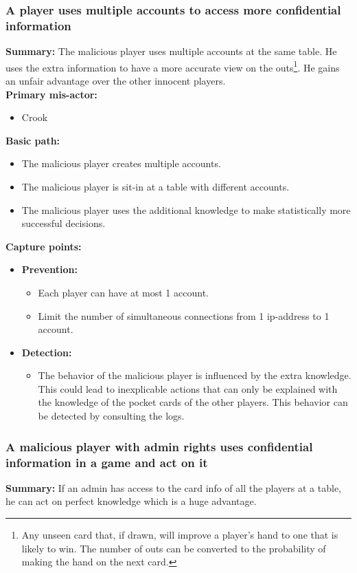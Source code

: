 \documentclass[a4paper,11pt]{report}
\begin{document}
\subsubsection{A player uses multiple accounts to access more confidential information}
\textbf{Summary:} The malicious player uses multiple accounts at the same table. He uses the extra information to  have a more accurate view on the outs\footnote{Any unseen card that, if drawn, will improve a player's hand to one that is likely to win. The number of outs can be converted to the probability of making the hand on the next card.}. He gains an unfair advantage over the other innocent players. \\
\textbf{Primary mis-actor:}
\begin{itemize}
\item Crook
\end{itemize}
\textbf{Basic path:}
\begin{itemize}
\item The malicious player creates multiple accounts. 
\item The malicious player is sit-in at a table with different accounts.
\item The malicious player uses the additional knowledge to make statistically more successful decisions. 
\end{itemize}
\textbf{Capture points:}
\begin{itemize}
\item \textbf{Prevention:}
\begin{itemize}
\item Each player can have at most 1 account.
\item Limit the number of simultaneous connections from 1 ip-address to 1 account.
\end{itemize}
\item \textbf{Detection:}
\begin{itemize}
\item The behavior of the malicious player is influenced by the extra knowledge. This could lead to inexplicable actions that can only be explained with the knowledge of the pocket cards of the other players. This behavior can be detected by consulting the logs.
\end{itemize}
\end{itemize}
\subsubsection{A malicious player with admin rights uses confidential information in a game and act on it}
\textbf{Summary:} If an admin has access to the card info of all the players at a table, he can act on perfect knowledge which is a huge advantage.
\end{document}
